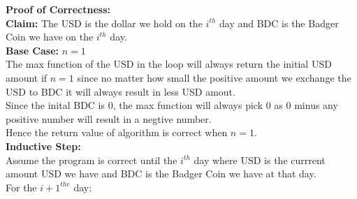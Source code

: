 \documentclass{article}
\begin{document}
\begin{enumerate}
\begin{itemize}
                     \textbf{Proof of Correctness:}\\
                     \textbf{   Claim: } The USD is the dollar we hold on the $i^{th}$ day and BDC is the Badger Coin we have on the $i^{th}$ day.\\
                     \textbf{Base Case: } $n=1$\\
                     The max function of the USD in the loop will always return the initial USD amount if $n=1$ since no matter how small the positive amount we exchange the USD to BDC it will always result in less USD amout. \\
                     Since the inital BDC is 0, the max function will always pick 0 as 0 minus any positive number will result in a negtive number.\\
                     Hence the return value of algorithm is correct when $n=1$. \\
                    \textbf{Inductive Step: } \\
                    Assume the program is correct until the $i^{th}$ day where USD is the currrent amount USD we have and BDC is the Badger Coin we have at that day. \\
                    For the $i+1^{the}$ day: \\
                    
       



            \end{itemize}

    \end{enumerate}
    
\end{document}
